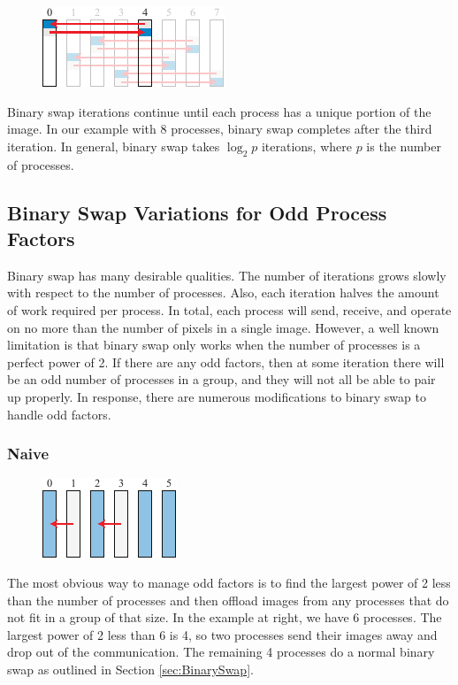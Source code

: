\documentclass{vgtc}                          %
\begin{document}
\begin{figure}
  \includegraphics[scale=.75]{binary-swap-3}
\end{figure}
Binary swap iterations continue until each process has a unique portion of the image.
In our example with 8 processes, binary swap completes after the third iteration.
In general, binary swap takes $\log_{2}p$ iterations, where $p$ is the number of processes.

\subsection{Binary Swap Variations for Odd Process Factors}
\label{sec:BinarySwapVariations}

Binary swap has many desirable qualities.
The number of iterations grows slowly with respect to the number of processes.
Also, each iteration halves the amount of work required per process.
In total, each process will send, receive, and operate on no more than the number of pixels in a single image.
However, a well known limitation is that binary swap only works when the number of processes is a perfect power of 2.
If there are any odd factors, then at some iteration there will be an odd number of processes in a group, and they will not all be able to pair up properly.
In response, there are numerous modifications to binary swap to handle odd factors.

\subsubsection{Naive}

\begin{figure}
  \includegraphics[scale=.75]{naive}
\end{figure}
The most obvious way to manage odd factors is to find the largest power of 2 less than the number of processes and then offload images from any processes that do not fit in a group of that size.
In the example at right, we have 6 processes.
The largest power of 2 less than 6 is 4, so two processes send their images away and drop out of the communication.
The remaining 4 processes do a normal binary swap as outlined in Section \ref{sec:BinarySwap}.
\end{document}
